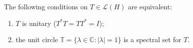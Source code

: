 The following conditions on $T \in \mathcal{L}(H)$ are equivalent:
\begin{enumerate}
\item[(a)] $T$ is unitary ($T^*T = TT^* = I$);
\item[(b)] the unit circle $\mathbb{T} = \{\lambda \in \mathbb{C} : |\lambda| = 1\}$ is a spectral set for $T$.
\end{enumerate}
